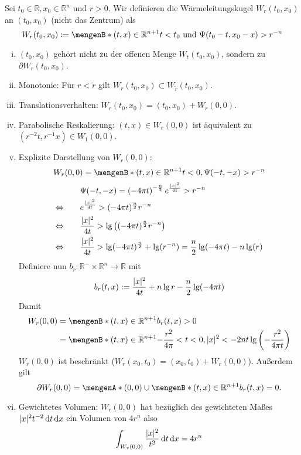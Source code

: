 \begin{definition}[Wärmeleitungskugel]
	Sei $t_0 \in \mathbb{R}, x_0 \in \mathbb{R}^n$ und $r >0$. Wir definieren die Wärmeleitungskugel $W_r(t_0,x_0)$ an $(t_0,x_0)$ (nicht das Zentrum) als
	\[
		W_r(t_0,x_0) := \set[(t,x) \in \mathbb{R}^{n+1}]{ t<t_0 \text{ und } \Psi(t_0-t, x_0-x)> r^{-n}}
	\]
\end{definition}
\begin{bemerkung}
	\begin{enumerate}[(i)]
		\item $(t_0,x_0)$ gehört nicht zu der offenen Menge $W_t(t_0,x_0)$, sondern zu \\ $\partial W_r(t_0,x_0)$.
		\item Monotonie: Für $r < \tilde r$ gilt $ W_r(t_0,x_0) \subset W_{\tilde r}(t_0,x_0)$.
		\item Translationsverhalten: $W_r(t_0,x_0) = (t_0,x_0)+ W_r(0,0)$.
		\item Parabolische Reskalierung: $(t,x) \in W_r(0,0)$ ist äquivalent zu $( r^{-2}t, r^{-1}x) \in W_1(0,0)$.
		\item Explizite Darstellung von $W_r(0,0)$:
		\[
			W_r(0,0) = \set[(t,x) \in \mathbb{R}^{n+1}]{t<0, \Psi(-t,-x)> r^{-n}}
		\] 
		\begin{align*}
			& \qquad \Psi(-t,-x) = \left( -4 \pi t \right)^{- \frac{n}{2}} e^{\frac{\lvert x\rvert^2}{4t}} > r^{-n} \\
			\Leftrightarrow & \qquad e^{\frac{\lvert x\rvert^2}{4t}} > (-4 \pi t)^{\frac{n}{2}} r^{-n}\\
			\Leftrightarrow & \qquad \frac{\lvert x\rvert^2}{4t} > \lg \left( (-4 \pi t)^{\frac{n}{2}} r^{-n} \right) \\
			\Leftrightarrow & \qquad \frac{\lvert x\rvert^2}{4t} > \lg (-4 \pi t)^{\frac{n}{2}} + \lg (r^{-n}) = \frac{n}{2} \lg (-4 \pi t)- n \lg ( r)
		\end{align*}
		Definiere nun $b_r: \mathbb{R}^- \times \mathbb{R}^n \to \mathbb{R}$ mit
		\[
			b_r(t,x):= \frac{\lvert x\rvert^2}{4t} + n \lg r - \frac{n}{2} \lg(-4 \pi t)
		\]
		Damit
		\begin{align*}
			W_r(0,0) &= \set[(t,x) \in \mathbb{R}^{n+1}]{b_r(t,x)>0} \\
			&= \set[(t,x) \in \mathbb{R}^{n+1}]{- \frac{r^2}{4 \pi} < t < 0 , \abs{x}^2 < - 2nt \lg \left( - \frac{r^2}{4 \pi t} \right)}
		\end{align*} 
		$W_r(0,0)$ ist beschränkt ($W_r(x_0,t_0)= (x_0,t_0)+ W_r(0,0)$). Außerdem gilt
		\[
			\partial W_r(0,0) = \set{(0,0)} \cup \set[(t,x) \in \mathbb{R}^{n+1}]{b_r(t,x)=0}.
		\]
		\item Gewichtetes Volumen: $W_r(0,0)$ hat bezüglich des gewichteten Maßes $\lvert x\rvert^2 t^{-2} \, \mathrm{d}t \, \mathrm{d}x$ ein Volumen von $4 r^n$ also
		\[
			\int_{W_r(0,0)}^{} \frac{\lvert x\rvert^2}{t^2} \,\mathrm{d}t \, \mathrm{d}x = 4 r^n
		\]
	\end{enumerate}
\end{bemerkung}

